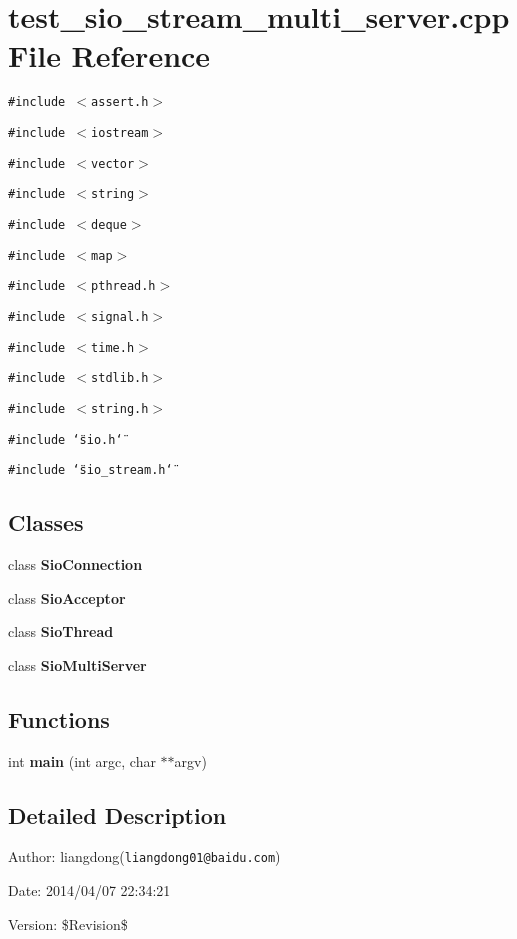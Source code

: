 \section{test\_\-sio\_\-stream\_\-multi\_\-server.cpp File Reference}
\label{test__sio__stream__multi__server_8cpp}
{\tt \#include $<$assert.h$>$}\par
{\tt \#include $<$iostream$>$}\par
{\tt \#include $<$vector$>$}\par
{\tt \#include $<$string$>$}\par
{\tt \#include $<$deque$>$}\par
{\tt \#include $<$map$>$}\par
{\tt \#include $<$pthread.h$>$}\par
{\tt \#include $<$signal.h$>$}\par
{\tt \#include $<$time.h$>$}\par
{\tt \#include $<$stdlib.h$>$}\par
{\tt \#include $<$string.h$>$}\par
{\tt \#include \char`\"{}sio.h\char`\"{}}\par
{\tt \#include \char`\"{}sio\_\-stream.h\char`\"{}}\par
\subsection*{Classes}
\begin{CompactItemize}
\item 
class {\bf Sio\-Connection}
\item 
class {\bf Sio\-Acceptor}
\item 
class {\bf Sio\-Thread}
\item 
class {\bf Sio\-Multi\-Server}
\end{CompactItemize}
\subsection*{Functions}
\begin{CompactItemize}
\item 
int {\bf main} (int argc, char $\ast$$\ast$argv)\label{test__sio__stream__multi__server_8cpp_a0}

\end{CompactItemize}


\subsection{Detailed Description}
\begin{Desc}
\item[Author:]liangdong({\tt liangdong01@baidu.com}) \end{Desc}
\begin{Desc}
\item[Date:]2014/04/07 22:34:21 \end{Desc}
\begin{Desc}
\item[Version:]\$Revision\$ \end{Desc}
